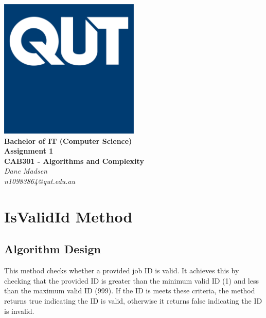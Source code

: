 \documentclass[12pt,a4paper]{article}
\begin{document}
	\begin{titlepage}
		
		\begin{center}
			\includegraphics[width=0.5\textwidth]{QUT.jpg}\\
			[0.03\textheight]  
			\Large\textbf{Bachelor of IT (Computer Science)}\\
			\Large\textbf{Assignment 1}\\
			\large\textbf{CAB301 - Algorithms and Complexity}\\
			[0.02\textheight]
			\large\textsl{Dane Madsen}\\
			\large\textsl{n10983864@qut.edu.au}
		\end{center}
		
	\end{titlepage}
	\tableofcontents
	\newpage
	
	\section{IsValidId Method}
		\subsection{Algorithm Design}
			This method checks whether a provided job ID is valid. It achieves this 
			by checking that the provided ID is greater than the minimum valid ID (1) and 
			less than the maximum valid ID (999). If the ID is meets these criteria, the 
			method returns true indicating the ID is valid, otherwise it returns false 
			indicating the ID is invalid.\\
\end{document}
